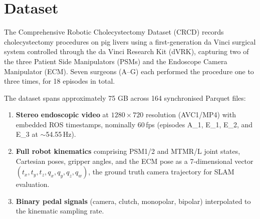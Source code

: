\documentclass{article}
\begin{document}
\section{Dataset}
The Comprehensive Robotic Cholecystectomy Dataset (CRCD)\cite{Oh2024} records cholecystectomy procedures on pig livers using a first-generation da Vinci surgical system controlled through the da Vinci Research Kit (dVRK), capturing two of the three Patient Side Manipulators (PSMs) and the Endoscope Camera Manipulator (ECM). Seven surgeons (A--G) each performed the procedure one to three times, for 18 episodes in total.

The dataset spans approximately 75 GB across 164 synchronised Parquet files:

\begin{enumerate}
    \item \textbf{Stereo endoscopic video} at $1280 \times 720$ resolution (AVC1/MP4) with embedded ROS timestamps, nominally 60\,fps (episodes A\_1, E\_1, E\_2, and E\_3 at $\sim$54.55\,Hz).
    \item \textbf{Full robot kinematics} comprising PSM1/2 and MTMR/L joint states, Cartesian poses, gripper angles, and the ECM pose as a 7-dimensional vector $(t_x, t_y, t_z, q_x, q_y, q_z, q_w)$, the ground truth camera trajectory for SLAM evaluation.
    \item \textbf{Binary pedal signals} (camera, clutch, monopolar, bipolar) interpolated to the kinematic sampling rate.
\end{enumerate}
\end{document}
